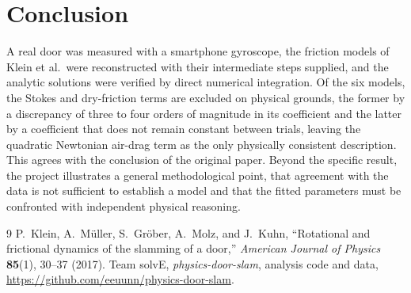 \documentclass[11pt,letterpaper]{article}
\begin{document}
\section{Conclusion}
A real door was measured with a smartphone gyroscope, the friction models of Klein et al.\
were reconstructed with their intermediate steps supplied, and the analytic solutions were
verified by direct numerical integration. Of the six models, the Stokes and dry-friction
terms are excluded on physical grounds, the former by a discrepancy of three to four orders
of magnitude in its coefficient and the latter by a coefficient that does not remain
constant between trials, leaving the quadratic Newtonian air-drag term as the only
physically consistent description. This agrees with the conclusion of the original paper.
Beyond the specific result, the project illustrates a general methodological point, that
agreement with the data is not sufficient to establish a model and that the fitted
parameters must be confronted with independent physical reasoning.

\begin{thebibliography}{9}
 P.~Klein, A.~M\"uller, S.~Gr\"ober, A.~Molz, and J.~Kuhn,
``Rotational and frictional dynamics of the slamming of a door,''
\textit{American Journal of Physics} \textbf{85}(1), 30--37 (2017).
\bibitem{repo} Team solvE, \textit{physics-door-slam}, analysis code and data,
\url{https://github.com/eeuunn/physics-door-slam}.
\end{thebibliography}
\end{document}
